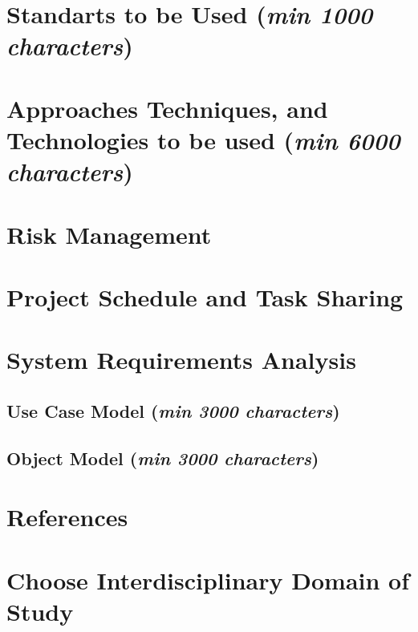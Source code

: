 \documentclass[12pt]{report}
\newcommand{\characters}[1]{(\textit{min #1 characters})}
\begin{document}
\section{Standarts to be Used  \characters{1000}}
\lipsum[9] %

\section{Approaches Techniques, and Technologies to be used \characters{6000}}
\lipsum[10] %

\section{Risk Management}
\lipsum[15]
\section{Project Schedule and Task Sharing}
\lipsum[16]

\section{System Requirements Analysis}

\subsection{Use Case Model \characters{3000}}
\lipsum[11]

\subsection{Object Model \characters{3000}}
\lipsum[12]

\section{References}
\lipsum[13]

\section{Choose Interdisciplinary Domain of Study}
\lipsum[14]
\end{document}
